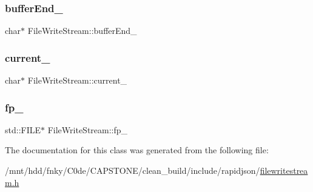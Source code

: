 \subsubsection{\texorpdfstring{buffer\+End\+\_\+}{bufferEnd\_}}
{\footnotesize\ttfamily char$\ast$ File\+Write\+Stream\+::buffer\+End\+\_\+\hspace{0.3cm}{\ttfamily [private]}}

\mbox{\label{classFileWriteStream_a3b3ba8e5deef1b12f0662e9031f05c71}} 
\subsubsection{\texorpdfstring{current\+\_\+}{current\_}}
{\footnotesize\ttfamily char$\ast$ File\+Write\+Stream\+::current\+\_\+\hspace{0.3cm}{\ttfamily [private]}}

\mbox{\label{classFileWriteStream_aac23a58bdaa601d276c57b5bcf5b0246}} 
\subsubsection{\texorpdfstring{fp\+\_\+}{fp\_}}
{\footnotesize\ttfamily std\+::\+F\+I\+LE$\ast$ File\+Write\+Stream\+::fp\+\_\+\hspace{0.3cm}{\ttfamily [private]}}



The documentation for this class was generated from the following file\+:\begin{DoxyCompactItemize}
\item 
/mnt/hdd/fnky/\+C0de/\+C\+A\+P\+S\+T\+O\+N\+E/clean\+\_\+build/include/rapidjson/\hyperlink{filewritestream_8h}{filewritestream.\+h}\end{DoxyCompactItemize}
